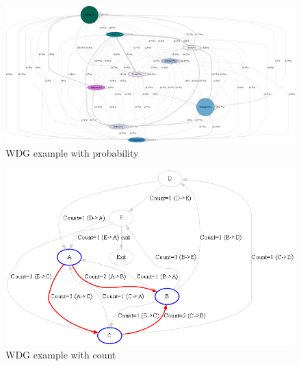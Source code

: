 \begin{enumerate}
\begin{figure}
  \centering
  \includegraphics[scale=.15]{../Graphics/log_with_color.png}
  \caption{WDG example with probability}\label{fig:log_with_color}
\end{figure}

\begin{figure}
  \centering
  \includegraphics[scale=.50]{../Graphics/sample_log.png}
  \caption{WDG example with count}\label{fig:sample_log}
\end{figure}

                
	\end{enumerate}


